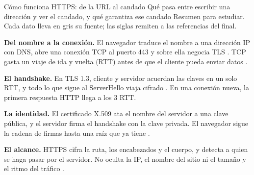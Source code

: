 \documentclass[10pt,a4paper]{article}
\begin{document}
  {Cómo funciona HTTPS: de la URL al candado}
  {Qué pasa entre escribir una dirección y ver el candado, y qué garantiza ese candado}
  {Resumen para estudiar. Cada dato lleva en gris su fuente; las siglas remiten a las referencias del final.}

\begin{cifras}[4]
\end{cifras}

\resumen
\textbf{Del nombre a la conexión.} El navegador traduce el nombre a una dirección IP con
DNS, abre una conexión TCP al puerto 443 y sobre ella negocia TLS .
TCP gasta un viaje de ida y vuelta (RTT) antes de que el cliente pueda enviar datos
.

\textbf{El handshake.} En TLS 1.3, cliente y servidor acuerdan las claves en un solo RTT, y
todo lo que sigue al ServerHello viaja cifrado . En una conexión
nueva, la primera respuesta HTTP llega a los 3 RTT.

\textbf{La identidad.} El certificado X.509 ata el nombre del servidor a una clave pública, y
el servidor firma el handshake con la clave privada. El navegador sigue la cadena de firmas
hasta una raíz que ya tiene .

\textbf{El alcance.} HTTPS cifra la ruta, los encabezados y el cuerpo, y detecta a quien se
haga pasar por el servidor. No oculta la IP, el nombre del sitio ni el tamaño y el ritmo del
tráfico .

\end{document}
